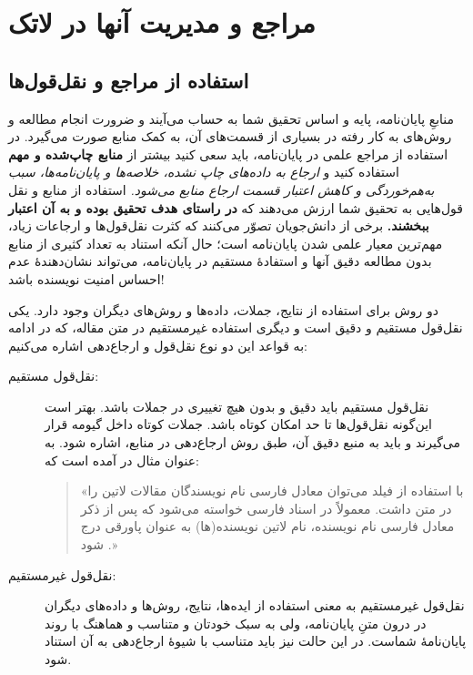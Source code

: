 \chapter{مراجع و مدیریت آنها در لاتک}
\label{app:refMan}

\section{استفاده از مراجع و نقل‌قول‌ها}
\label{sec:refUsage}
منابعِ پایان‌نامه، پایه و اساس تحقیق شما به حساب می‌آیند و ضرورت انجام مطالعه و روش‌های به کار رفته در بسیاری از قسمت‌های آن، به کمک منابع صورت می‌گیرد. در استفاده از مراجع علمی در پایان‌نامه، باید سعی کنید بیشتر از
\textbf{منابع چاپ‌شده و مهم}
استفاده کنید و
\emph{ارجاع به داده‌های چاپ نشده، خلاصه‌ها و پایان‌نامه‌ها، سبب به‌هم‌خوردگی و کاهش اعتبار قسمت ارجاع منابع می‌شود.}
استفاده از منابع و نقل قول‌هایی به تحقیق شما ارزش می‌دهند که
\textbf{در راستای هدف تحقیق بوده و به آن اعتبار ببخشند.}
برخی از دانش‌جویان تصوّر می‌کنند که کثرت نقل‌قول‌ها و ارجاعات زیاد، مهم‌ترین معیار علمی شدن پایان‌نامه است؛ حال آنکه استناد به تعداد کثیری از منابع بدون مطالعه دقیق آنها و استفادهٔ مستقیم در پایان‌نامه، می‌تواند نشان‌دهندهٔ عدم احساس امنیت نویسنده باشد!

دو روش برای استفاده از نتایج، جملات، داده‌ها و روش‌های دیگران وجود دارد. یکی نقل‌قول مستقیم و دقیق است و دیگری استفاده غیرمستقیم در متن مقاله، که در ادامه به قواعد این دو نوع نقل‌قول و ارجاع‌دهی اشاره می‌کنیم:
\begin{description}
	\item[نقل‌قول مستقیم:]
	نقل‌قول مستقیم باید دقیق و بدون هیچ تغییری در جملات باشد. بهتر است این‌گونه نقل‌قول‌ها تا حد امکان کوتاه باشد. جملات کوتاه داخل گیومه قرار می‌گیرند و باید به منبع دقیق آن، طبق روش ارجاع‌دهی در منابع، اشاره شود. به عنوان مثال در
	\cite{persianbib87userguide}
	آمده است که:
	\begin{quote}
		«با استفاده از فیلد
		می‌توان معادل فارسی نام نویسندگان مقالات لاتین را در متن داشت. معمولاً در اسناد فارسی خواسته می‌شود که پس از ذکر معادل فارسی نام نویسنده، نام لاتین نویسنده(ها) به عنوان پاورقی درج شود
		\citep{persianbib87userguide}.»
	\end{quote}
	\item[نقل‌قول غیرمستقیم:]
	نقل‌قول غیرمستقیم به معنی استفاده از ایده‌ها، نتایج، روش‌ها و داده‌های دیگران در درون متنِ پایان‌نامه، ولی به سبک خودتان و متناسب و هماهنگ با روند پایان‌نامهٔ شماست. در این حالت نیز باید متناسب با شیوهٔ ارجاع‌دهی به آن استناد شود.
\end{description}

